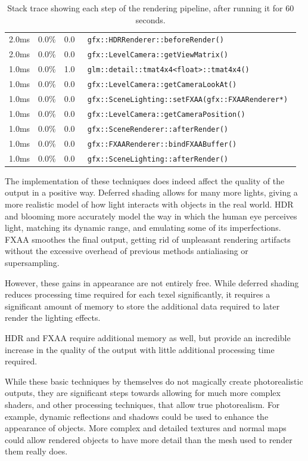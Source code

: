 \documentclass[11pt, oneside]{report}
\begin{document}
\begin{table}[!htbp]
\begin{tabularx}{0.88\textwidth}{| r | c | c | >{\tt}X |}
		2.0ms & 0.0\% & 0.0 & {gfx::HDRRenderer::beforeRender()} \\
		2.0ms & 0.0\% & 0.0 & {gfx::LevelCamera::getViewMatrix()} \\
		1.0ms & 0.0\% & 1.0 & {glm::detail::tmat4x4<float>::tmat4x4()} \\[1ex]
		1.0ms & 0.0\% & 0.0 & {gfx::LevelCamera::getCameraLookAt()} \\
		1.0ms & 0.0\% & 0.0 & {gfx::SceneLighting::setFXAA(gfx::FXAARenderer*)} \\
		1.0ms & 0.0\% & 0.0 & {gfx::LevelCamera::getCameraPosition()} \\
		1.0ms & 0.0\% & 0.0 & {gfx::SceneRenderer::afterRender()} \\[1ex]
		1.0ms & 0.0\% & 0.0 & {gfx::FXAARenderer::bindFXAABuffer()} \\
		1.0ms & 0.0\% & 0.0 & {gfx::SceneLighting::afterRender()} \\
		\hline
	\end{tabularx}
	
	\caption{Stack trace showing each step of the rendering pipeline, after running it for 60 seconds.}
	\label{tab:booktabs}
\end{table}

The implementation of these techniques does indeed affect the quality of the output in a positive way. Deferred shading allows for many more lights, giving a more realistic model of how light interacts with objects in the real world. \gls{HDR} and blooming more accurately model the way in which the human eye perceives light, matching its dynamic range, and emulating some of its imperfections. \gls{FXAA} smoothes the final output, getting rid of unpleasant rendering artifacts without the excessive overhead of previous methods antialiasing or \gls{supersampling}.

However, these gains in appearance are not entirely free. While deferred shading reduces processing time required for each \gls{texel} significantly, it requires a significant amount of memory to store the additional data required to later render the lighting effects.

\gls{HDR} and \gls{FXAA} require additional memory as well, but provide an incredible increase in the quality of the output with little additional processing time required.

While these basic techniques by themselves do not magically create photorealistic outputs, they are significant steps towards allowing for much more complex shaders, and other processing techniques, that allow true photorealism. For example, dynamic reflections and shadows could be used to enhance the appearance of objects. More complex and detailed textures and normal maps could allow rendered objects to have more detail than the mesh used to render them really does.
\end{document}
